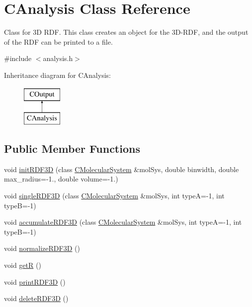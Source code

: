\hypertarget{classCAnalysis}{}\section{C\+Analysis Class Reference}
\label{classCAnalysis}


Class for 3D R\+DF. This class creates an object for the 3D-\/\+R\+DF, and the output of the R\+DF can be printed to a file.  




{\ttfamily \#include $<$analysis.\+h$>$}

Inheritance diagram for C\+Analysis\+:\begin{figure}[H]
\begin{center}
\leavevmode
\includegraphics[height=2.000000cm]{classCAnalysis}
\end{center}
\end{figure}
\subsection*{Public Member Functions}
\begin{DoxyCompactItemize}
\item 
void \mbox{\hyperlink{classCAnalysis_ac20cd821313a1e36ab0f63e93d6e4149}{init\+R\+D\+F3D}} (class \mbox{\hyperlink{classCMolecularSystem}{C\+Molecular\+System}} \&mol\+Sys, double binwidth, double max\+\_\+radius=-\/1., double volume=-\/1.)
\item 
void \mbox{\hyperlink{classCAnalysis_ab3566f13bda907427f28c82706ac3aec}{single\+R\+D\+F3D}} (class \mbox{\hyperlink{classCMolecularSystem}{C\+Molecular\+System}} \&mol\+Sys, int typeA=-\/1, int typeB=-\/1)
\item 
void \mbox{\hyperlink{classCAnalysis_a5d6f09a6fd0f9756e69ace8f595756b6}{accumulate\+R\+D\+F3D}} (class \mbox{\hyperlink{classCMolecularSystem}{C\+Molecular\+System}} \&mol\+Sys, int typeA=-\/1, int typeB=-\/1)
\item 
void \mbox{\hyperlink{classCAnalysis_a1716c9da84e9d41cbb32b97f7708e9f7}{normalize\+R\+D\+F3D}} ()
\item 
void \mbox{\hyperlink{classCAnalysis_ac90e1a07030a0954036f4461562b0c1b}{getR}} ()
\item 
void \mbox{\hyperlink{classCAnalysis_adf290a55dbb19e9150f03d45fb419cee}{print\+R\+D\+F3D}} ()
\item 
void \mbox{\hyperlink{classCAnalysis_ae54948a0123c7ef52857e47363923500}{delete\+R\+D\+F3D}} ()
\end{DoxyCompactItemize}
